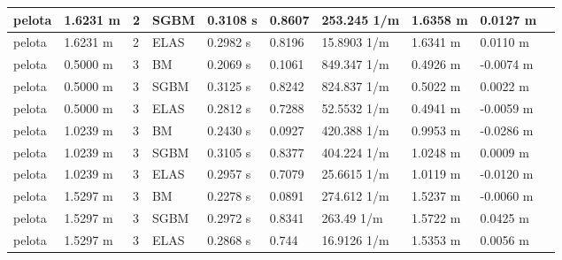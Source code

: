 \documentclass[11pt,a4paper,titlepage]{article}
\begin{document}
\begin{table}[!ht]
\begin{tabular}{@{}llllllllll@{}}
pelota & 1.6231 m & 2 & SGBM & 0.3108 s & 0.8607 & 253.245 1/m & 1.6358 m & 0.0127 m \\ \midrule
pelota & 1.6231 m & 2 & ELAS & 0.2982 s & 0.8196 & 15.8903 1/m & 1.6341 m & 0.0110 m \\ \midrule
pelota & 0.5000 m & 3 & BM & 0.2069 s & 0.1061 & 849.347 1/m & 0.4926 m & -0.0074 m \\ \midrule
pelota & 0.5000 m & 3 & SGBM & 0.3125 s & 0.8242 & 824.837 1/m & 0.5022 m & 0.0022 m \\ \midrule
pelota & 0.5000 m & 3 & ELAS & 0.2812 s & 0.7288 & 52.5532 1/m & 0.4941 m & -0.0059 m \\ \midrule
pelota & 1.0239 m & 3 & BM & 0.2430 s & 0.0927 & 420.388 1/m & 0.9953 m & -0.0286 m \\ \midrule
pelota & 1.0239 m & 3 & SGBM & 0.3105 s & 0.8377 & 404.224 1/m & 1.0248 m & 0.0009 m \\ \midrule
pelota & 1.0239 m & 3 & ELAS & 0.2957 s & 0.7079 & 25.6615 1/m & 1.0119 m & -0.0120 m \\ \midrule
pelota & 1.5297 m & 3 & BM & 0.2278 s & 0.0891 & 274.612 1/m & 1.5237 m & -0.0060 m \\ \midrule
pelota & 1.5297 m & 3 & SGBM & 0.2972 s & 0.8341 & 263.49 1/m & 1.5722 m & 0.0425 m \\ \midrule
pelota & 1.5297 m & 3 & ELAS & 0.2868 s & 0.744 & 16.9126 1/m & 1.5353 m & 0.0056 m \\ \midrule
\end{tabular}
\end{table}
\end{document}
